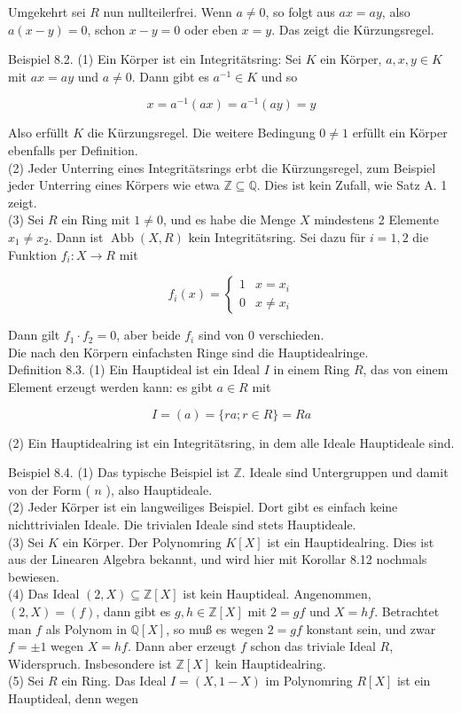 \documentclass[10pt, letterpaper]{article}
\begin{document}
Umgekehrt sei $R$ nun nullteilerfrei. Wenn $a \neq 0$, so folgt aus $a x=a y$, also $a(x-y)=0$, schon $x-y=0$ oder eben $x=y$. Das zeigt die Kürzungsregel.

Beispiel 8.2. (1) Ein Körper ist ein Integritätsring: Sei $K$ ein Körper, $a, x, y \in K$ mit $a x=a y$ und $a \neq 0$. Dann gibt es $a^{-1} \in K$ und so

$$
x=a^{-1}(a x)=a^{-1}(a y)=y
$$

Also erfüllt $K$ die Kürzungsregel. Die weitere Bedingung $0 \neq 1$ erfüllt ein Körper ebenfalls per Definition.\\
(2) Jeder Unterring eines Integritätsrings erbt die Kürzungsregel, zum Beispiel jeder Unterring eines Körpers wie etwa $\mathbb{Z} \subseteq \mathbb{Q}$. Dies ist kein Zufall, wie Satz A. 1 zeigt.\\
(3) Sei $R$ ein Ring mit $1 \neq 0$, und es habe die Menge $X$ mindestens 2 Elemente $x_{1} \neq x_{2}$. Dann ist $\operatorname{Abb}(X, R)$ kein Integritätsring. Sei dazu für $i=1,2$ die Funktion $f_{i}: X \rightarrow R$ mit

$$
f_{i}(x)= \begin{cases}1 & x=x_{i} \\ 0 & x \neq x_{i}\end{cases}
$$

Dann gilt $f_{1} \cdot f_{2}=0$, aber beide $f_{i}$ sind von 0 verschieden.\\
Die nach den Körpern einfachsten Ringe sind die Hauptidealringe.\\
Definition 8.3. (1) Ein Hauptideal ist ein Ideal $I$ in einem Ring $R$, das von einem Element erzeugt werden kann: es gibt $a \in R$ mit

$$
I=(a)=\{r a ; r \in R\}=R a
$$

(2) Ein Hauptidealring ist ein Integritätsring, in dem alle Ideale Hauptideale sind.

Beispiel 8.4. (1) Das typische Beispiel ist $\mathbb{Z}$. Ideale sind Untergruppen und damit von der Form ( $n$ ), also Hauptideale.\\
(2) Jeder Körper ist ein langweiliges Beispiel. Dort gibt es einfach keine nichttrivialen Ideale. Die trivialen Ideale sind stets Hauptideale.\\
(3) Sei $K$ ein Körper. Der Polynomring $K[X]$ ist ein Hauptidealring. Dies ist aus der Linearen Algebra bekannt, und wird hier mit Korollar 8.12 nochmals bewiesen.\\
(4) Das Ideal $(2, X) \subseteq \mathbb{Z}[X]$ ist kein Hauptideal. Angenommen, $(2, X)=(f)$, dann gibt es $g, h \in \mathbb{Z}[X]$ mit $2=g f$ und $X=h f$. Betrachtet man $f$ als Polynom in $\mathbb{Q}[X]$, so muß es wegen $2=g f$ konstant sein, und zwar $f= \pm 1$ wegen $X=h f$. Dann aber erzeugt $f$ schon das triviale Ideal $R$, Widerspruch. Insbesondere ist $\mathbb{Z}[X]$ kein Hauptidealring.\\
(5) Sei $R$ ein Ring. Das Ideal $I=(X, 1-X)$ im Polynomring $R[X]$ ist ein Hauptideal, denn wegen
\end{document}
